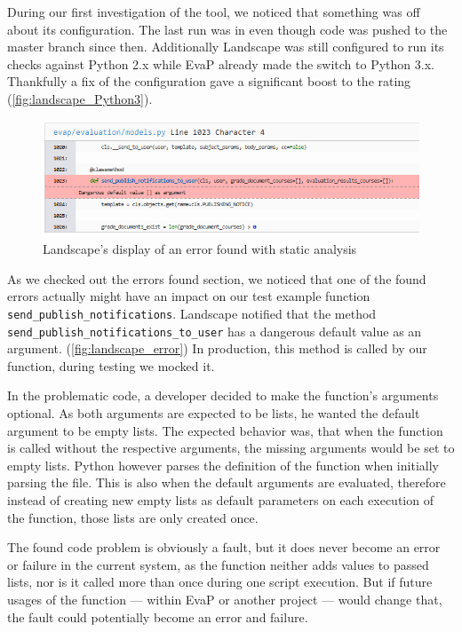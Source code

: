 During our first investigation of the tool, we noticed that something was off about its configuration.
The last run was in %
even though code was pushed to the master branch since then.
Additionally Landscape was still configured to run its checks against Python 2.x while EvaP already made the switch to Python 3.x.
Thankfully a fix of the configuration gave a significant boost to the rating (\autoref{fig:landscape_Python3}).

\begin{figure}[h]
    \centering
    \includegraphics[width=\textwidth, keepaspectratio]{graphics/landscape_error}
    \caption{Landscape's display of an error found with static analysis}
    \label{fig:landscape_error}
\end{figure}

As we checked out the errors found section, we noticed that one of the found errors actually might have an impact on our test example function \texttt{send\_publish\_notifications}.
Landscape notified that the method \texttt{send\_publish\_notifications\_to\_user} has a dangerous default value as an argument.
(\autoref{fig:landscape_error})
In production, this method is called by our function, during testing we mocked it.

In the problematic code, a developer decided to make the function's arguments optional.
As both arguments are expected to be lists, he wanted the default argument to be empty lists.
The expected behavior was, that when the function is called without the respective arguments, the missing arguments would be set to empty lists.
Python however parses the definition of the function when initially parsing the file.
This is also when the default arguments are evaluated, therefore instead of creating new empty lists as default parameters on each execution of the function, those lists are only created once.

The found code problem is obviously a fault, but it does never become an error or failure in the current system, as the function neither adds values to passed lists, nor is it called more than once during one script execution.
But if future usages of the function --- within EvaP or another project --- would change that, the fault could potentially become an error and failure.


